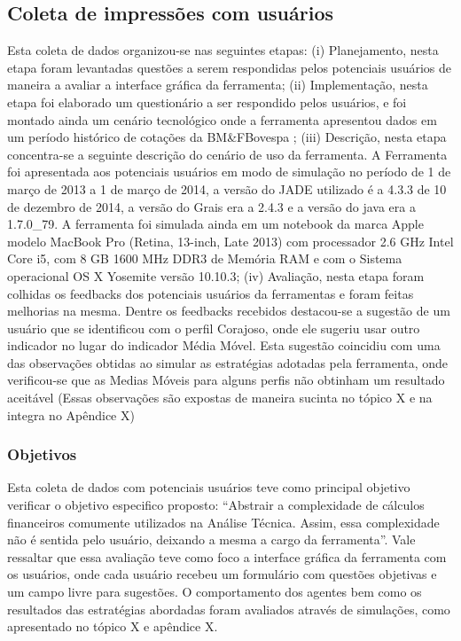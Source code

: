 \subsection{Coleta de impressões com usuários}

Esta coleta de dados organizou-se nas seguintes etapas: (i) Planejamento, nesta etapa foram levantadas questões a serem respondidas pelos potenciais usuários de maneira a avaliar a interface gráfica da ferramenta; (ii) Implementação, nesta etapa foi elaborado um questionário a ser respondido pelos usuários, e foi montado ainda um cenário tecnológico onde a ferramenta apresentou dados em um período histórico de cotações da BM\&FBovespa ; (iii) Descrição, nesta etapa concentra-se a seguinte descrição do cenário de uso da ferramenta. A Ferramenta foi apresentada aos potenciais usuários em modo de simulação no período de 1 de março de 2013 a 1 de março de 2014, a versão do JADE utilizado é a 4.3.3 de 10 de dezembro de 2014, a versão do Grais era a 2.4.3 e a versão do java era a 1.7.0\_79. A ferramenta foi simulada ainda em um notebook da marca Apple modelo MacBook Pro (Retina, 13-inch, Late 2013) com processador 2.6 GHz Intel Core i5, com 8 GB 1600 MHz DDR3 de Memória RAM e com o Sistema operacional OS X Yosemite versão 10.10.3; (iv) Avaliação, nesta etapa foram colhidas os feedbacks dos potenciais usuários da ferramentas e foram feitas melhorias na mesma. Dentre os feedbacks recebidos destacou-se a sugestão de um usuário que se identificou com o perfil Corajoso, onde ele sugeriu usar outro indicador no lugar do indicador Média Móvel. Esta sugestão coincidiu com uma das observações obtidas ao simular as estratégias adotadas pela ferramenta, onde verificou-se que as Medias Móveis para alguns perfis não obtinham um resultado aceitável (Essas observações são expostas de maneira sucinta no tópico X e na integra no Apêndice X)

\subsubsection{Objetivos}

Esta coleta de dados com potenciais usuários teve como principal objetivo verificar  o objetivo especifico proposto: “Abstrair a complexidade de cálculos financeiros comumente utilizados na Análise Técnica. Assim, essa complexidade não é sentida pelo usuário, deixando a mesma a cargo da ferramenta”. Vale ressaltar que essa avaliação teve como foco a interface gráfica da ferramenta com os usuários, onde cada usuário recebeu um formulário com questões objetivas e um campo livre para sugestões. O comportamento dos agentes bem como os resultados das estratégias abordadas foram avaliados através de simulações, como apresentado no tópico X e apêndice X.


